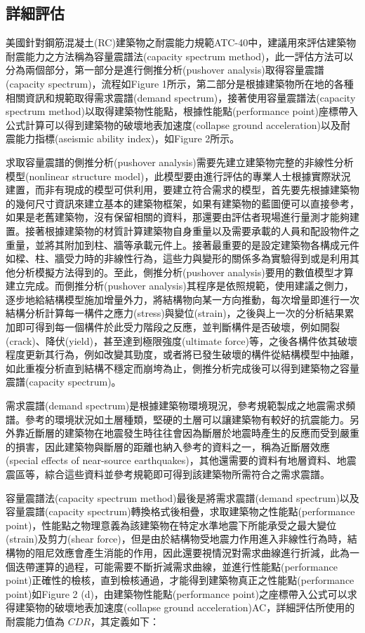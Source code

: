 \subsection{詳細評估}

美國針對鋼筋混凝土(RC)建築物之耐震能力規範ATC-40\cite{applied1996seismic}中，建議用來評估建築物耐震能力之方法稱為容量震譜法(capacity spectrum method)，此一評估方法可以分為兩個部分，第一部分是進行側推分析(pushover analysis)取得容量震譜(capacity spectrum)，流程如Figure 1所示，第二部分是根據建築物所在地的各種相關資訊和規範取得需求震譜(demand spectrum)，接著使用容量震譜法(capacity spectrum method)以取得建築物性能點，根據性能點(performance point)座標帶入公式計算可以得到建築物的破壞地表加速度(collapse ground acceleration)以及耐震能力指標(aseismic ability index)，如Figure 2所示。

求取容量震譜的側推分析(pushover analysis)需要先建立建築物完整的非線性分析模型(nonlinear structure model)，此模型要由進行評估的專業人士根據實際狀況建置，而非有現成的模型可供利用，要建立符合需求的模型，首先要先根據建築物的幾何尺寸資訊來建立基本的建築物框架，如果有建築物的藍圖便可以直接參考，如果是老舊建築物，沒有保留相關的資料，那還要由評估者現場進行量測才能夠建置。接著根據建築物的材質計算建築物自身重量以及需要承載的人員和配設物件之重量，並將其附加到柱、牆等承載元件上。接著最重要的是設定建築物各構成元件如樑、柱、牆受力時的非線性行為，這些力與變形的關係多為實驗得到或是利用其他分析模擬方法得到的。至此，側推分析(pushover analysis)要用的數值模型才算建立完成。而側推分析(pushover analysis)其程序是依照規範，使用建議之側力，逐步地給結構模型施加增量外力，將結構物向某一方向推動，每次增量即進行一次結構分析計算每一構件之應力(stress)與變位(strain)，之後與上一次的分析結果累加即可得到每一個構件於此受力階段之反應，並判斷構件是否破壞，例如開裂(crack)、降伏(yield)，甚至達到極限強度(ultimate force)等，之後各構件依其破壞程度更新其行為，例如改變其勁度，或者將已發生破壞的構件從結構模型中抽離，如此重複分析直到結構不穩定而崩垮為止，側推分析完成後可以得到建築物之容量震譜(capacity spectrum)。

需求震譜(demand spectrum)是根據建築物環境現況，參考規範製成之地震需求頻譜。參考的環境狀況如土層種類，堅硬的土層可以讓建築物有較好的抗震能力。另外靠近斷層的建築物在地震發生時往往會因為斷層於地震時產生的反應而受到嚴重的損害，因此建築物與斷層的距離也納入參考的資料之一，稱為近斷層效應(special effects of near-source earthquakes)，其他還需要的資料有地層資料、地震震區等，綜合這些資料並參考規範即可得到該建築物所需符合之需求震譜。

容量震譜法(capacity spectrum method)最後是將需求震譜(demand spectrum)以及容量震譜(capacity spectrum)轉換格式後相疊，求取建築物之性能點(performance point)，性能點之物理意義為該建築物在特定水準地震下所能承受之最大變位(strain)及剪力(shear force)，但是由於結構物受地震力作用進入非線性行為時，結構物的阻尼效應會產生消能的作用，因此還要視情況對需求曲線進行折減，此為一個迭帶運算的過程，可能需要不斷折減需求曲線，並進行性能點(performance point)正確性的檢核，直到檢核通過，才能得到建築物真正之性能點(performance point)如Figure 2 (d)，由建築物性能點(performance point)之座標帶入公式可以求得建築物的破壞地表加速度(collapse ground acceleration)AC，詳細評估所使用的耐震能力值為 $CDR$，其定義如下：

